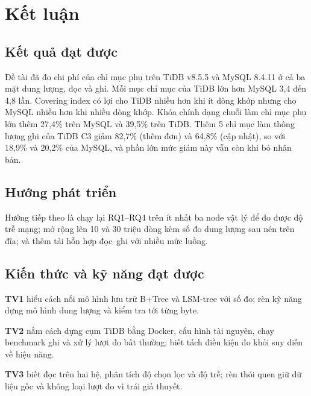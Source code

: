 \clearpage
\section*{Kết luận}

\subsection*{Kết quả đạt được}

Đề tài đã đo chi phí của chỉ mục phụ trên TiDB v8.5.5 và MySQL 8.4.11 ở cả ba mặt dung lượng, đọc và ghi. Mỗi mục chỉ mục của TiDB lớn hơn MySQL 3,4 đến 4,8 lần. Covering index có lợi cho TiDB nhiều hơn khi ít dòng khớp nhưng cho MySQL nhiều hơn khi nhiều dòng khớp. Khóa chính dạng chuỗi làm chỉ mục phụ lớn thêm 27,4\% trên MySQL và 39,5\% trên TiDB. Thêm 5 chỉ mục làm thông lượng ghi của TiDB C3 giảm 82,7\% (thêm đơn) và 64,8\% (cập nhật), so với 18,9\% và 20,2\% của MySQL, và phần lớn mức giảm này vẫn còn khi bỏ nhân bản.



\subsection*{Hướng phát triển}

Hướng tiếp theo là chạy lại RQ1--RQ4 trên ít nhất ba node vật lý để đo được độ trễ mạng; mở rộng lên 10 và 30 triệu dòng kèm số đo dung lượng sau nén trên đĩa; và thêm tải hỗn hợp đọc--ghi với nhiều mức luồng.

\subsection*{Kiến thức và kỹ năng đạt được}

\textbf{TV1} hiểu cách nối mô hình lưu trữ B+Tree và LSM-tree với số đo; rèn kỹ năng dựng mô hình dung lượng và kiểm tra tới từng byte.

\textbf{TV2} nắm cách dựng cụm TiDB bằng Docker, cấu hình tài nguyên, chạy benchmark ghi và xử lý lượt đo bất thường; biết tách điều kiện đo khỏi suy diễn về hiệu năng.

\textbf{TV3} biết đọc  trên hai hệ, phân tích độ chọn lọc và độ trễ; rèn thói quen giữ dữ liệu gốc và không loại lượt đo vì trái giả thuyết.
